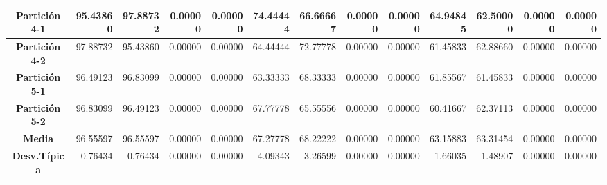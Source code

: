 \documentclass[a4paper,11pt]{article}
\begin{document}
\begin{table}[H]
\begin{adjustbox}{width=1.1\textwidth}
\begin{tabular}{|c|r|r|r|r|r|r|r|r|r|r|r|r|}
  \textbf{Partición 4-1} & 95.43860 & 97.88732 & 0.00000 & 0.00000 & 74.44444 & 66.66667 & 0.00000 & 0.00000 & 64.94845 & 62.50000 & 0.00000 & 0.00000 \\ \hline
  \textbf{Partición 4-2} & 97.88732 & 95.43860 & 0.00000 & 0.00000 & 64.44444 & 72.77778 & 0.00000 & 0.00000 & 61.45833 & 62.88660 & 0.00000 & 0.00000 \\ \hline
  \textbf{Partición 5-1} & 96.49123 & 96.83099 & 0.00000 & 0.00000 & 63.33333 & 68.33333 & 0.00000 & 0.00000 & 61.85567 & 61.45833 & 0.00000 & 0.00000 \\ \hline
  \textbf{Partición 5-2} & 96.83099 & 96.49123 & 0.00000 & 0.00000 & 67.77778 & 65.55556 & 0.00000 & 0.00000 & 60.41667 & 62.37113 & 0.00000 & 0.00000 \\ \hline
  \textbf{Media} & 96.55597 & 96.55597 & 0.00000 & 0.00000 & 67.27778 & 68.22222 & 0.00000 & 0.00000 & 63.15883 & 63.31454 & 0.00000 & 0.00000 \\ \hline
  \textbf{Desv.Típica} & 0.76434 & 0.76434 & 0.00000 & 0.00000 & 4.09343 & 3.26599 & 0.00000 & 0.00000 & 1.66035 & 1.48907 & 0.00000 & 0.00000 \\ \hline
  \end{tabular}
  \end{adjustbox}
  \label{NN3}
  \end{table}
  
\end{document}
